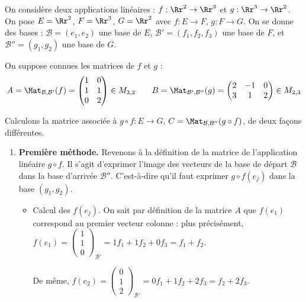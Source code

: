 \documentclass[class=report,crop=false]{standalone}
\begin{document}
\begin{exemple}
On considère deux applications linéaires :
$f : \Rr^2 \to \Rr^3$ et $g : \Rr^3 \to \Rr^2$.
On pose $E = \Rr^2$, $F=\Rr^3$, $G=\Rr^2$ avec
$f : E \to F$, $g : F \to G$.
On se donne des bases :
$\mathcal{B} = (e_1,e_2)$ une base de $E$,
$\mathcal{B}' = (f_1,f_2,f_3)$ une base de $F$, et
$\mathcal{B}'' = (g_1,g_2)$ une base de $G$.

On suppose connues les matrices de $f$ et $g$ :
$$A = \Mat_{\mathcal{B},\mathcal{B}'} (f)
= \begin{pmatrix}
1&0\cr
1&1\cr
0&2\cr
\end{pmatrix}
\in M_{3,2} \qquad
B = \Mat_{\mathcal{B}',\mathcal{B}''} (g)
= \begin{pmatrix}
2&-1&0\cr
3&1&2\cr
\end{pmatrix}
\in M_{2,3}$$

Calculons la matrice associée à $g \circ f : E \to G$,
$C = \Mat_{\mathcal{B},\mathcal{B}''} (g \circ f)$, de deux façons différentes.

\begin{enumerate}
  \item \textbf{Première méthode.} Revenons à la définition de la matrice de l'application linéaire
  $g\circ f$. Il s'agit d'exprimer l'image des vecteurs de la base de départ $\mathcal{B}$ dans la
  base d'arrivée $\mathcal{B}''$. C'est-à-dire qu'il faut exprimer $g\circ f (e_j)$ dans la base $(g_1,g_2)$.

  \begin{itemize}
    \item Calcul des $f(e_j)$. On sait par définition de la matrice $A$ que
    $f(e_1)$ correspond au premier vecteur colonne : plus précisément,
    $f(e_1) = \left(\begin{smallmatrix}1\\1\\0\end{smallmatrix}\right)_{\!\!\mathcal{B}'} = 1 f_1 + 1 f_2 + 0 f_3 = f_1+f_2$.

    De même,
    $f(e_2) = \left(\begin{smallmatrix}0\\1\\2\end{smallmatrix}\right)_{\!\!\mathcal{B}'} = 0 f_1 + 1 f_2 + 2 f_3 = f_2+2f_3$.



\end{itemize}
\end{enumerate}
\end{exemple}
\end{document}
